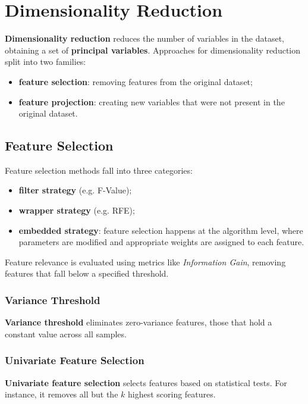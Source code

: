 \section{Dimensionality Reduction}

\textbf{Dimensionality reduction} reduces the number of variables in the dataset, obtaining a set of \textbf{principal variables}. Approaches for dimensionality reduction split into two families:
\begin{itemize}
    \item \textbf{feature selection}: removing features from the original dataset;
    \item \textbf{feature projection}: creating new variables that were not present in the original dataset.
\end{itemize}

\subsection{Feature Selection}

Feature selection methods fall into three categories:
\begin{itemize}
    \item \textbf{filter strategy} (e.g. F-Value);
    \item \textbf{wrapper strategy} (e.g. RFE);
    \item \textbf{embedded strategy}: feature selection happens at the algorithm level, where parameters are modified and appropriate weights are assigned to each feature.
\end{itemize}

Feature relevance is evaluated using metrics like \textit{Information Gain}, removing features that fall below a specified threshold.

\subsubsection{Variance Threshold}

\textbf{Variance threshold} eliminates zero-variance features, those that hold a constant value across all samples.

\subsubsection{Univariate Feature Selection}
\textbf{Univariate feature selection} selects features based on statistical tests. For instance, it removes all but the $k$ highest scoring features.

